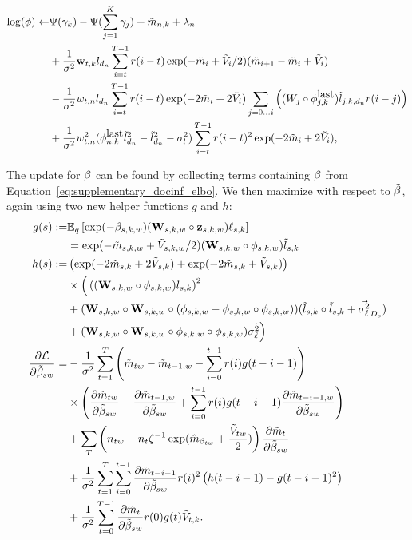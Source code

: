 \begin{align}
\log(\phi) \gets & \Psi(\gamma_k) - \Psi(\sum_{j=1}^K \gamma_j) + \tilde{m}_{n,k} + \lambda_n \\ \nonumber
& + \frac{1}{\sigma^2} \textbf{w}_{t,k} l_{d_n} \sum_{i=t}^{T-1} r(i-t) \exp(-\tilde{m}_i + \tilde{V}_i / 2) (\tilde{m}_{i + 1} - \tilde{m}_i + \tilde{V}_i) \\ \nonumber
& - \frac{1}{\sigma^2} w_{t,n} l_{d_n} \sum_{i=t}^{T-1} r(i-t) \exp(-2\tilde{m}_i + 2 \tilde{V}_i) \sum_{j=0\ldots i} \left( (W_{j} \circ \phi_{j,k}^{\mbox{last}}) \tilde{l}_{j,k,d_n} r(i-j) \right) \\ \nonumber
& + \frac{1} {\sigma^2} w_{t,n}^2 (\phi_{n,k}^{\mbox{last}} \tilde{l}_{d_n}^2 - \tilde{l}_{d_n}^2 - \sigma_l^2) \sum_{i=t}^{T-1} r(i-t)^2 \exp(-2\tilde{m}_i + 2 \tilde{V}_i), \nonumber
\end{align}

The update for $\tilde{\beta}$ can be found by collecting terms containing $\tilde{\beta}$
from Equation~\ref{eq:supplementary_docinf_elbo}.  We then maximize with respect to $\tilde{\beta}$, again using two new helper functions $g$ and $h$:
\begin{align*}
%
%
g(s) := & \expectq{\exp(-\beta_{s,k,w} ) ( \W_{s,k,w} \circ \z_{s,k,w} ) \ell_{s,k} } \\ \nonumber
        & = \exp(-\mv_{s,k,w} + \vv_{s,k,w} / 2) ( \W_{s,k,w} \circ \phi_{s,k,w} ) \lv_{s,k} \\ \nonumber
h(s) := & \left( \exp(-2 \mv_{s,k} + 2 \vv_{s,k}) + \exp(-2 \mv_{s,k} + \vv_{s,k}) \right) \\ \nonumber
       & \times \Big( \left( (\W_{s,k,w} \circ \phi_{s,k,w}) l_{s,k} \right)^2 \\ \nonumber
       & + ( \W_{s,k,w} \circ \W_{s,k,w} \circ ( \phi_{s,k,w} - \phi_{s,k,w} \circ \phi_{s,k,w} ) ) (\lv_{s,k} \circ \lv_{s,k} + \vec{\vlv}_{D_{s}}) \notag \\ \nonumber
       & + ( \W_{s,k,w} \circ \W_{s,k,w} \circ \phi_{s,k,w} \circ \phi_{s,k,w} ) \vec{\vlv} \Big)\notag \\ \nonumber
\partl{\mathcal{L}}{\bv_{sw}} =
   & - \frac{1}{\sigma^2} \sum_{t=1}^T
     \left( \mv_{tw} - \mv_{t-1,w} - \sum_{i=0}^{t-1} r(i) g(t-i-1) \right) \\ \nonumber
    &  \times \left( \partl{\mv_{tw}}{\bv_{sw}}
     - \partl{\mv_{t-1,w}}{\bv_{sw}}
     + \sum_{i=0}^{t-1} r(i) g(t-i-1) \partl{\mv_{t-i-1,w}}{\bv_{sw}} \right) \\ \nonumber
   & + \sum_T \left(
       n_{tw} - n_{t} \zeta^{-1}
       \exp( \hat{m}_{\bb_{tw}} + \frac{\tilde{V}_{tw}}{2} ) \right)
       \partl{\mv_t}{\bv_{sw}} \\ \nonumber
   & + \frac{1}{\sigma^2} \sum_{t=1}^T
         \sum_{i=0}^{t-1} \partl{\mv_{t-i-1}}{\bv_{sw}}
         r(i)^2 \left( h(t-i-1) - g(t-i-1)^2 \right) \\ \nonumber
   & + \frac{1}{\sigma^2} \sum_{t=0}^{T-1}
         \partl{\mv_{t}}{\bv_{sw}}
         r(0) g(t) \vv_{t,k}.  \nonumber
\end{align*}

